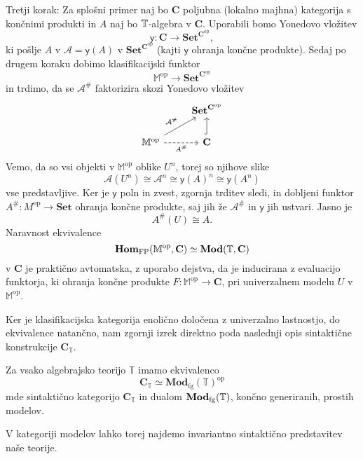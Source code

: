 \documentclass[../kategoricna_logika.tex]{subfiles}
\begin{document}
\begin{dokaz}
  Tretji korak: Za splošni primer naj bo $\mathbf{C}$ poljubna (lokalno majhna) kategorija
  s končnimi produkti in $A$ naj bo $\mathbb{T}$-algebra v $\mathbf{C}$.
  Uporabili bomo Yonedovo vložitev
  \[ \mathsf{y} : \mathbf{C} \to \mathbf{Set}^{\mathbf{C}^{\mathrm{op}}},\]
  ki pošlje $A$ v $\mathcal{A} = \mathsf{y}(A)$ v $\mathbf{Set}^{\mathbf{C}^{\mathrm{op}}}$
  (kajti $\mathsf{y}$ ohranja končne produkte). Sedaj po drugem koraku dobimo klasifikacijski
  funktor
  \[ \mathbb{M}^{\mathrm{op}} \to \mathbf{Set}^{\mathbf{C}^{\mathrm{op}}}\]
  in trdimo, da se $\mathcal{A}^{\#}$ faktorizira skozi Yonedovo vložitev
  \begin{equation*}
    \begin{tikzcd}
      & \mathbf{Set}^{\mathbf{C}^{\mathrm{op}}} \\
      \mathbb{M}^{\mathrm{op}} \ar[ur, "\mathcal{A}^{\#}"] \ar[r, dashed, "A^{\#}"'] &
      \mathbf{C} \ar[u, hook]
    \end{tikzcd}
  \end{equation*}
  Vemo, da so vsi objekti v $\mathbb{M}^{\mathrm{op}}$ oblike $U^n$, torej so njihove slike
  \[ \mathcal{A}(U^n) \cong \mathcal{A}^n \cong \mathsf{y}(A)^n \cong \mathsf{y}(A^n)\]
  vse predstavljive. Ker je $\mathsf{y}$ poln in zvest, zgornja trditev sledi, in
  dobljeni funktor $A^{\#} : M^{\mathrm{op}} \to \mathbf{Set}$ ohranja končne produkte, saj jih
  že $\mathcal{A}^{\#}$ in $\mathsf{y}$ jih ustvari. Jasno je
  \[ A^{\#}(U) \cong A.\]
  Naravnost ekvivalence
  \[ \mathbf{Hom}_{\mathrm{FP}}(\mathbb{M}^{\mathrm{op}},\mathbf{C}) \simeq \mathbf{Mod}(\mathbb{T}, \mathbf{C})\]
  v $\mathbf{C}$ je praktično avtomatska, z uporabo dejstva, da je inducirana z evaluacijo
  funktorja, ki ohranja končne produkte $F : \mathbb{M}^{\mathrm{op}} \to \mathbf{C}$,
  pri univerzalnem modelu $U$ v $\mathbb{M}^{\mathrm{op}}$.
\end{dokaz}
Ker je klasifikacijska kategorija enolično določena z univerzalno lastnostjo,
do ekvivalence natančno, nam zgornji izrek direktno poda naslednji opis sintaktične
konstrukcije $\mathbf{C}_{\mathbb{T}}$.
\begin{posledica}
Za vsako algebrajsko teorijo \(\mathbb{T}\) imamo ekvivalenco
\[ \mathbf{C}_{\mathbb{T}} \simeq \mathbf{Mod}_{\mathrm{fg}}(\mathbb{T})^{\mathrm{op}} \]
mde sintaktično kategorijo \(\mathbf{C}_{\mathbb{T}}\) in dualom
\(\mathbf{Mod}_{\mathrm{fg}}(\mathbb{T})\), končno generiranih,
prostih modelov.
\end{posledica}
V kategoriji modelov lahko torej najdemo invariantno sintaktično
predstavitev naše teorije.
\end{document}

